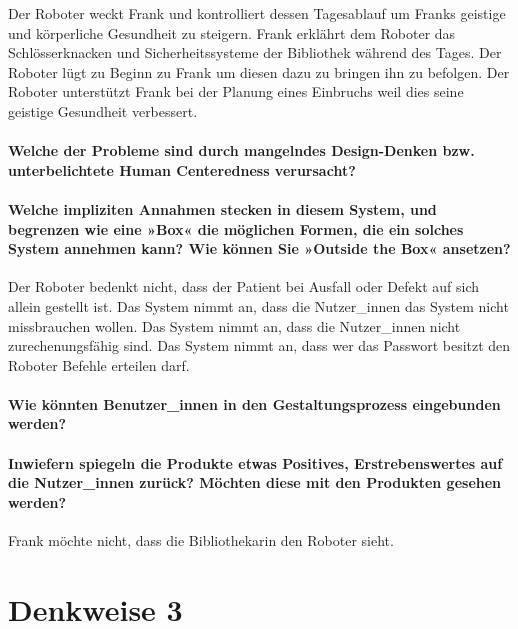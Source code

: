 \documentclass[sigchi-a, authorversion]{acmart}
\begin{document}
Der Roboter weckt Frank und kontrolliert dessen Tagesablauf um Franks geistige und körperliche Gesundheit zu steigern.
Frank erklährt dem Roboter das Schlösserknacken und Sicherheitssysteme der Bibliothek während des Tages.
Der Roboter lügt zu Beginn zu Frank um diesen dazu zu bringen ihn zu befolgen.
Der Roboter unterstützt Frank bei der Planung eines Einbruchs weil dies seine geistige Gesundheit verbessert.

\paragraph{Welche der Probleme sind durch mangelndes Design-Denken bzw. unterbelichtete Human Centeredness
verursacht?}

\paragraph
{Welche impliziten Annahmen stecken in diesem System, und begrenzen wie eine »Box« die möglichen Formen, die ein solches System annehmen kann? Wie können Sie »Outside the Box« ansetzen?}

Der Roboter bedenkt nicht, dass der Patient bei Ausfall oder Defekt auf sich allein gestellt ist.
Das System nimmt an, dass die Nutzer\_innen das System nicht missbrauchen wollen.
Das System nimmt an, dass die Nutzer\_innen nicht zurechenungsfähig sind.
Das System nimmt an, dass wer das Passwort besitzt den Roboter Befehle erteilen darf.

\paragraph{Wie könnten Benutzer\_innen in den Gestaltungsprozess eingebunden werden?}
\paragraph
{Inwiefern spiegeln die Produkte etwas Positives, Erstrebenswertes auf die Nutzer\_innen zurück? Möchten diese mit den Produkten gesehen werden?}

Frank möchte nicht, dass die Bibliothekarin den Roboter sieht.

\section{Denkweise 3}
\end{document}
